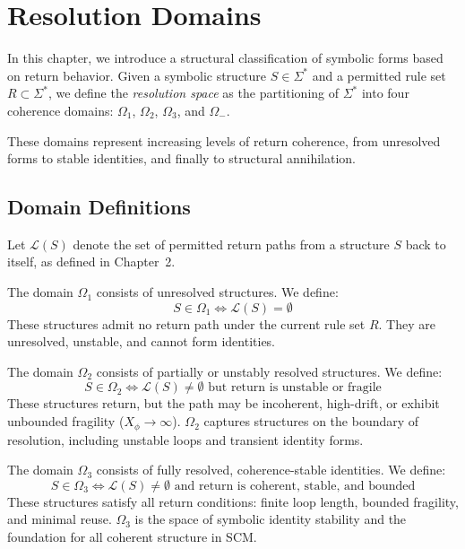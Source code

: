 \chapter{Resolution Domains}

In this chapter, we introduce a structural classification of symbolic forms based on return behavior.  
Given a symbolic structure $S \in \Sigma^*$ and a permitted rule set $R \subset \Sigma^*$,  
we define the \textit{resolution space} as the partitioning of $\Sigma^*$ into four coherence domains:  
$\Omega_1$, $\Omega_2$, $\Omega_3$, and $\Omega_-$.

These domains represent increasing levels of return coherence, from unresolved forms to stable identities, and finally to structural annihilation.

\section{Domain Definitions}

Let $\mathcal{L}(S)$ denote the set of permitted return paths from a structure $S$ back to itself, as defined in Chapter~2.

\begin{definition} \label{def:omega1}
The domain $\Omega_1$ consists of unresolved structures. We define:
\begin{equation} \label{eq:omega1}
S \in \Omega_1 \iff \mathcal{L}(S) = \emptyset
\end{equation}
These structures admit no return path under the current rule set $R$.  
They are unresolved, unstable, and cannot form identities.
\end{definition}

\begin{definition} \label{def:omega2}
The domain $\Omega_2$ consists of partially or unstably resolved structures. We define:
\begin{equation} \label{eq:omega2}
S \in \Omega_2 \iff \mathcal{L}(S) \neq \emptyset \text{ but return is unstable or fragile}
\end{equation}
These structures return, but the path may be incoherent, high-drift, or exhibit unbounded fragility ($X_\phi \rightarrow \infty$).  
$\Omega_2$ captures structures on the boundary of resolution, including unstable loops and transient identity forms.
\end{definition}

\begin{definition} \label{def:omega3}
The domain $\Omega_3$ consists of fully resolved, coherence-stable identities. We define:
\begin{equation} \label{eq:omega3}
S \in \Omega_3 \iff \mathcal{L}(S) \neq \emptyset \text{ and return is coherent, stable, and bounded}
\end{equation}
These structures satisfy all return conditions: finite loop length, bounded fragility, and minimal reuse.  
$\Omega_3$ is the space of symbolic identity stability and the foundation for all coherent structure in SCM.
\end{definition}

